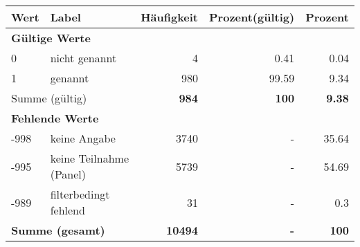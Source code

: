      \begin{longtable}{lXrrr}
     \toprule
     \textbf{Wert} & \textbf{Label} & \textbf{Häufigkeit} & \textbf{Prozent(gültig)} & \textbf{Prozent} \\
     \endhead
     \midrule
     \multicolumn{5}{l}{\textbf{Gültige Werte}}\\

     0 &
     \multicolumn{1}{X}{ nicht genannt   } &


       \num{4} &
       \num[round-mode=places,round-precision=2]{0.41} &
         \num[round-mode=places,round-precision=2]{0.04} \\

     1 &
     \multicolumn{1}{X}{ genannt   } &


       \num{980} &
       \num[round-mode=places,round-precision=2]{99.59} &
         \num[round-mode=places,round-precision=2]{9.34} \\
     \midrule
     \multicolumn{2}{l}{Summe (gültig)} &
       \textbf{\num{984}} &
     \textbf{\num{100}} &
       \textbf{\num[round-mode=places,round-precision=2]{9.38}} \\
     \multicolumn{5}{l}{\textbf{Fehlende Werte}}\\
       -998 &
       keine Angabe &
         \num{3740} &
        - &
         \num[round-mode=places,round-precision=2]{35.64} \\
       -995 &
       keine Teilnahme (Panel) &
         \num{5739} &
        - &
         \num[round-mode=places,round-precision=2]{54.69} \\
       -989 &
       filterbedingt fehlend &
         \num{31} &
        - &
         \num[round-mode=places,round-precision=2]{0.3} \\
     \midrule
     \multicolumn{2}{l}{\textbf{Summe (gesamt)}} &
          \textbf{\num{10494}} &
        \textbf{-} &
        \textbf{\num{100}} \\
     \bottomrule
     \end{longtable}
     
